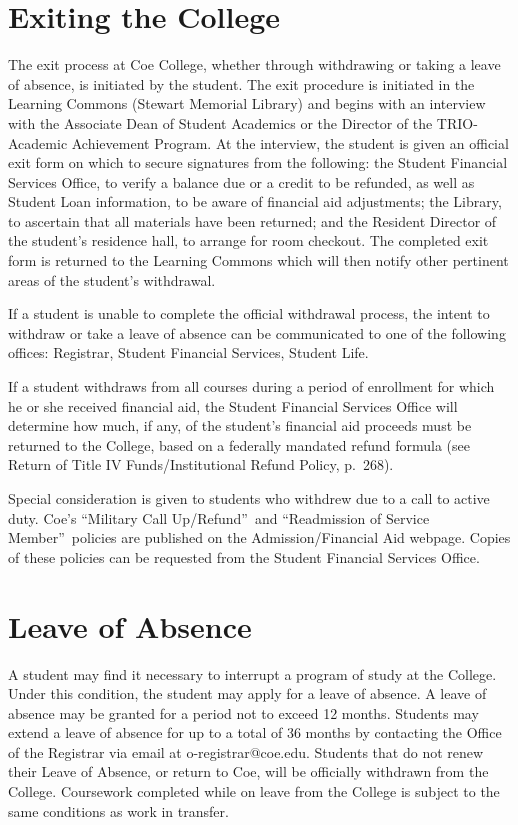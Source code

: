 \documentclass[
  letterpaper,
]{scrbook}
\begin{document}
\section{Exiting the College}\label{exiting-the-college}

The exit process at Coe College, whether through withdrawing or taking a
leave of absence, is initiated by the student. The exit procedure is
initiated in the Learning Commons (Stewart Memorial Library) and begins
with an interview with the Associate Dean of Student Academics or the
Director of the TRIO-Academic Achievement Program. At the interview, the
student is given an official exit form on which to secure signatures
from the following: the Student Financial Services Office, to verify a
balance due or a credit to be refunded, as well as Student Loan
information, to be aware of financial aid adjustments; the Library, to
ascertain that all materials have been returned; and the Resident
Director of the student's residence hall, to arrange for room checkout.
The completed exit form is returned to the Learning Commons which will
then notify other pertinent areas of the student's withdrawal.

If a student is unable to complete the official withdrawal process, the
intent to withdraw or take a leave of absence can be communicated to one
of the following offices: Registrar, Student Financial Services, Student
Life.

If a student withdraws from all courses during a period of enrollment
for which he or she received financial aid, the Student Financial
Services Office will determine how much, if any, of the student's
financial aid proceeds must be returned to the College, based on a
federally mandated refund formula (see Return of Title IV
Funds/Institutional Refund Policy, p.~268).

Special consideration is given to students who withdrew due to a call to
active duty. Coe's ``Military Call Up/Refund''~and ``Readmission of
Service Member''~policies are published on the Admission/Financial Aid
webpage. Copies of these policies can be requested from the Student
Financial Services Office.

\section{Leave of Absence}\label{leave-of-absence}

A student may find it necessary to interrupt a program of study at the
College. Under this condition, the student may apply for a leave of
absence. A leave of absence may be granted for a period not to exceed 12
months. Students may extend a leave of absence for up to a total of 36
months by contacting the Office of the Registrar via email at
o-registrar@coe.edu. Students that do not renew their Leave of Absence,
or return to Coe, will be officially withdrawn from the College.
Coursework completed while on leave from the College is subject to the
same conditions as work in transfer.
\end{document}
